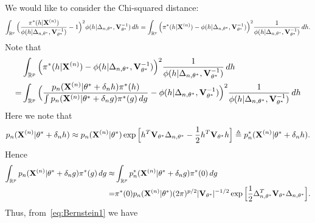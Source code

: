 \documentclass[3p]{elsarticle}
\theoremstyle{plain}
\theoremstyle{definition}
\theoremstyle{remark}
\begin{document}
We would like to consider the Chi-squared distance:
$$
\int_{\mathbb{R}^p}\Big(\frac{\pi^*(h|\mathbf{X}^{(n)})}{\phi(h|\Delta_{n,\theta^*},\mathbf{V}_{\theta^*}^{-1})}-1\Big)^2 {\phi(h|\Delta_{n,\theta^*},\mathbf{V}_{\theta^*}^{-1})} \, dh 
=
\int_{\mathbb{R}^p}\Big(\pi^*(h|\mathbf{X}^{(n)})-\phi(h|\Delta_{n,\theta^*},\mathbf{V}_{\theta^*}^{-1})\Big)^2 \frac{1}{\phi(h|\Delta_{n,\theta^*},\mathbf{V}_{\theta^*}^{-1})} \, dh.
$$
Note that
\begin{equation}\label{eq:Bernstein1}
\begin{aligned}
    &\int_{\mathbb{R}^p}\Big(\pi^*(h|\mathbf{X}^{(n)})-\phi(h|\Delta_{n,\theta^*},\mathbf{V}_{\theta^*}^{-1})\Big)^2 \frac{1}{\phi(h|\Delta_{n,\theta^*},\mathbf{V}_{\theta^*}^{-1})} \, dh\\
    =&
    \int_{\mathbb{R}^p}
    \Big(
    \frac{p_n(\mathbf{X}^{(n)}|\theta^*+\delta_n h) \pi^*(h)}{\int p_n (\mathbf{X}^{(n)}|\theta^*+\delta_n g) \pi^*(g) \, dg}
    -\phi(h|\Delta_{n,\theta^*},\mathbf{V}_{\theta^*}^{-1})\Big)^2 \frac{1}{\phi(h|\Delta_{n,\theta^*},\mathbf{V}_{\theta^*}^{-1})} \, dh\\
\end{aligned}
\end{equation}
Here we note that 
$$
p_n(\mathbf{X}^{(n)}|\theta^*+\delta_n h)
\approx p_{n}(\mathbf{X}^{(n)}|\theta^*)
\exp\Big[
h^T \mathbf{V}_{\theta^*}\Delta_{n,\theta^*}-\frac{1}{2} h^T \mathbf{V}_{\theta^*} h
\Big]\triangleq p^*_n(\mathbf{X}^{(n)}|\theta^*+\delta_n h).
$$
Hence
$$
\begin{aligned}
\int_{\mathbb{R}^p} p_n (\mathbf{X}^{(n)}|\theta^*+\delta_n g) \pi^*(g) \, dg
    \approx&
\int_{\mathbb{R}^p} p_n^* (\mathbf{X}^{(n)}|\theta^*+\delta_n g) \pi^*(0) \, dg\\
    =&
\pi^*(0)
p_{n}(\mathbf{X}^{(n)}|\theta^*)
(2\pi)^{p/2} |\mathbf{V}_{\theta^*}|^{-1/2}
\exp\Big[
    \frac{1}{2}\Delta_{n,\theta^*}^T \mathbf{V}_{\theta^*} \Delta_{n,\theta^*}
    \Big].
\end{aligned}
$$
Thus, from~\eqref{eq:Bernstein1} we have
\end{document}
